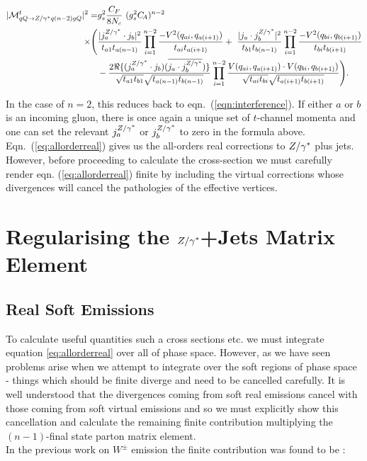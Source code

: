 		\begin{align}
		\begin{split}
		    |\mathcal{M}^{t}_{qQ\to Z/\gamma^* q(n-2)gQ}|^2 = &g_s^2 \frac{C_F}{8N_c}\ ( g_s^2
		    C_{\!A})^{n-2}\  \\  \times \Bigg(& \frac{| j_a^{Z/\gamma^*}\cdot j_b|^2}{t_{a1}t_{a(n-1)}} \prod^{n-2}_{i=1} \frac{-V^2(q_{ai},
		      q_{a(i+1)})}{t_{ai} t_{a(i+1)}}+\ \frac{|j_a \cdot j_b^{Z/\gamma^*} |^2}{t_{b1}t_{b(n-1)}}
		    \prod^{n-2}_{i=1}\frac{-V^2(q_{bi}, q_{b(i+1)})}{t_{bi} t_{b(i+1)}}  \\
		    &- \frac{2\Re\{(j_a^{Z/\gamma^*}\cdot j_b)(\overline{j_a \cdot
		        j_b^{Z/\gamma^*}})\}}{\sqrt{t_{a1}t_{b1}}\sqrt{t_{a(n-1)} t_{b(n-1)}}}
		    \prod^{n-2}_{i=1}\frac{V(q_{ai}, q_{a(i+1)})\cdot V(q_{bi},
		      q_{b(i+1)})}{\sqrt{t_{ai}t_{bi}} \sqrt{t_{a(i+1)}t_{b(i+1)}}}\Bigg).
			\label{eq:allorderreal}
		\end{split}
		\end{align}

		In the case of $n=2$, this reduces back to eqn.~(\ref{eqn:interference}).  If
		either $a$ or $b$ is an incoming gluon, there is once again a unique set of
		$t$-channel momenta and one can set the relevant $j_a^{Z/\gamma^*}$ or $j_b^{Z/\gamma^*}$ to
		zero in the formula above.\\Eqn.~(\ref{eq:allorderreal}) gives us the all-orders
		real corrections to $Z/\gamma^*$ plus jets.  However, before proceeding to calculate the
		cross-section we must carefully render eqn. (\ref{eq:allorderreal}) finite by
		including the virtual corrections whose divergences will cancel the pathologies
		of the effective vertices.

\section{Regularising the $Z/\gamma^*$+Jets Matrix Element}
	\label{sec:regularising}

	\subsection{Real Soft Emissions}
		\label{sub:softEmissions}

		To calculate useful quantities such a cross sections etc. we must integrate equation
		\eqref{eq:allorderreal} over all of phase space.  However, as we have seen problems arise
		when we attempt to integrate over the soft regions of phase space
		- things which should be finite diverge and need to be cancelled carefully.  It is well understood
		that the divergences coming from soft real emissions cancel with those coming from soft
		virtual emissions and so we must explicitly show this cancellation and calculate the remaining
		finite contribution multiplying the $(n-1)$-final state parton matrix element.\\
		In the previous work on $W^\pm$ emission the finite contribution was found to be
		\cite{Andersen:2009nu, Andersen:2008gc}:

